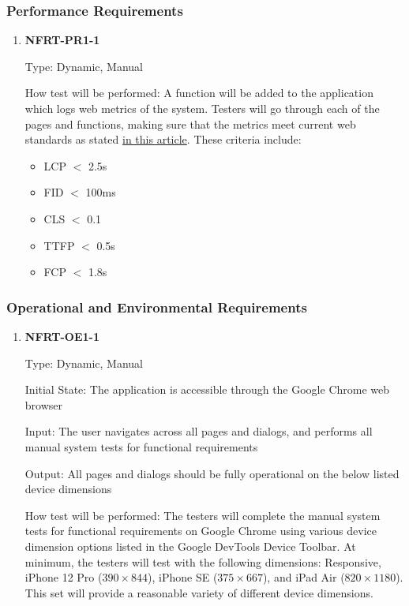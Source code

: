 \documentclass[12pt, titlepage]{article}
\begin{document}
\subsubsection{Performance Requirements}
\begin{enumerate}
	\item \textbf{NFRT-PR1-1} %

	      Type: Dynamic, Manual

	      How test will be performed: A function will be added to the application which logs web metrics of
	      the system. Testers will go through each of the pages and functions, making sure that the metrics
	      meet current web standards as stated \href{https://web.dev/vitals/}{in this article}. These
	      criteria include:
	      \begin{itemize}
		      \item LCP $<$ 2.5s
		      \item FID $<$ 100ms
		      \item CLS $<$ 0.1
		      \item TTFP $<$ 0.5s
		      \item FCP $<$ 1.8s
	      \end{itemize}

\end{enumerate}

\subsubsection{Operational and Environmental Requirements}
\begin{enumerate}

	\item \textbf{NFRT-OE1-1} %

	      Type: Dynamic, Manual

	      Initial State: The application is accessible through the Google Chrome web browser

	      Input: The user navigates across all pages and dialogs, and performs all manual system tests for
	      functional requirements

	      Output: All pages and dialogs should be fully operational on the below listed device dimensions

	      How test will be performed: The testers will complete the manual system tests for functional
	      requirements on Google Chrome using various device dimension options listed in the Google DevTools
	      Device Toolbar. At minimum, the testers will test with the following dimensions: Responsive, iPhone
	      12 Pro ($390 \times 844$), iPhone SE ($375 \times 667$), and iPad Air ($820 \times 1180$). This set
	      will provide a reasonable variety of different device dimensions.

\end{enumerate}
\end{document}
